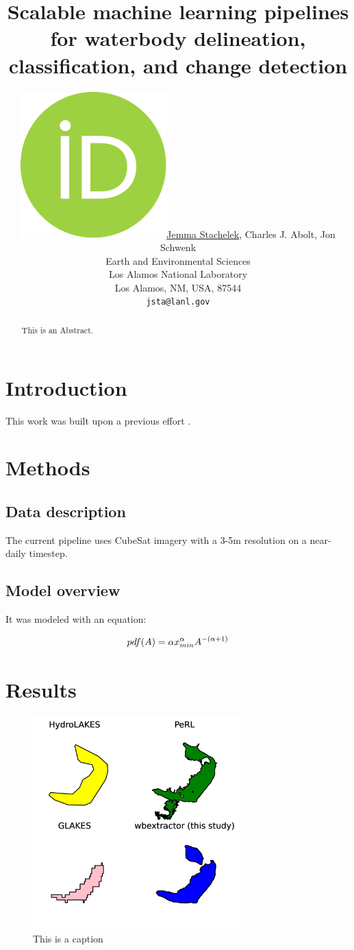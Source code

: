 \documentclass{article}
\title{Scalable machine learning pipelines for waterbody delineation, classification, and change detection}
\date{} 					%
\author{ \href{https://orcid.org/0000-0002-5924-2464}{\includegraphics[scale=0.06]{orcid.pdf}\hspace{1mm}Jemma Stachelek}, Charles J. Abolt, Jon Schwenk \\
	Earth and Environmental Sciences\\
	Los Alamos National Laboratory\\
	Los Alamos, NM, USA, 87544 \\
	\texttt{jsta@lanl.gov} \\
}
\begin{document}
\maketitle

\begin{abstract}
	This is an Abstract.
\end{abstract}

\section{Introduction}
This work was built upon a previous effort \citep{stachelek_hydroml}.

\section{Methods}

\subsection{Data description}

The current pipeline uses CubeSat imagery with a 3-5m resolution on a near-daily timestep.

\subsection{Model overview}

It was modeled with an equation:

\begin{equation}
	pdf(A) = \alpha x_{min}^{\alpha}A^{-(\alpha+1)} \\
	\label{eqn:pareto_pdf}
\end{equation}

\section{Results}

\begin{figure}
	\centering
	\includegraphics[width=8cm]{../figures/single_wb}
	\caption{This is a caption}
	\label{fig:single_wb}
\end{figure}
\end{document}
